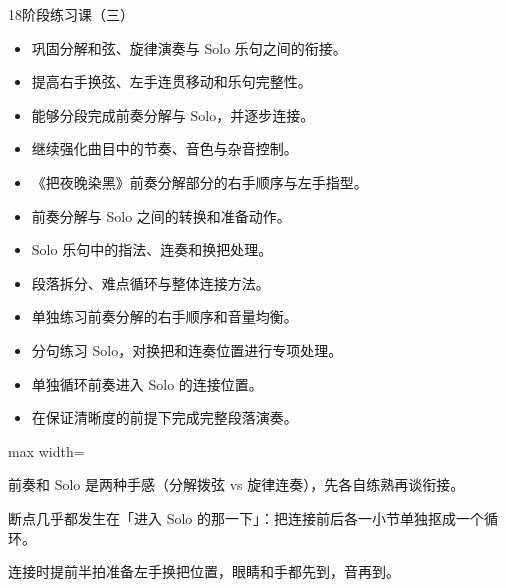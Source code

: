 \begin{lessoncard}{18}{阶段练习课（三）}
\begin{itemize}
\item 巩固分解和弦、旋律演奏与 Solo 乐句之间的衔接。
\item 提高右手换弦、左手连贯移动和乐句完整性。
\item 能够分段完成前奏分解与 Solo，并逐步连接。
\item 继续强化曲目中的节奏、音色与杂音控制。
\end{itemize}
\begin{itemize}
\item 《把夜晚染黑》前奏分解部分的右手顺序与左手指型。
\item 前奏分解与 Solo 之间的转换和准备动作。
\item Solo 乐句中的指法、连奏和换把处理。
\item 段落拆分、难点循环与整体连接方法。
\end{itemize}
\begin{itemize}
\item 单独练习前奏分解的右手顺序和音量均衡。
\item 分句练习 Solo，对换把和连奏位置进行专项处理。
\item 单独循环前奏进入 Solo 的连接位置。
\item 在保证清晰度的前提下完成完整段落演奏。
\end{itemize}
\begin{fignote}
\begin{center}
\begin{adjustbox}{max width=\textwidth}
\steparrow
{}\steparrow
{}\steparrow
{}
\end{adjustbox}
\end{center}
\begin{fignotes}
\item 前奏和 Solo 是两种手感（分解拨弦 vs 旋律连奏），先各自练熟再谈衔接。
\item 断点几乎都发生在「进入 Solo 的那一下」：把连接前后各一小节单独抠成一个循环。
\item 连接时提前半拍准备左手换把位置，眼睛和手都先到，音再到。
\end{fignotes}
\end{fignote}
\end{lessoncard}

